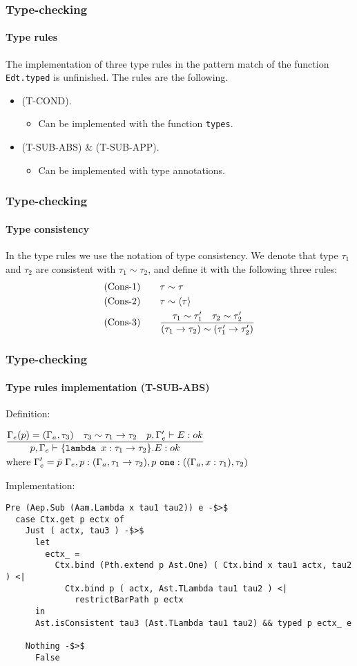 \begin{frame}
    \frametitle{Type-checking}
    \framesubtitle{Type rules}
    The implementation of three type rules in the pattern match of the
    function \texttt{Edt.typed} is unfinished. The rules are the
    following.
    \pause
    \begin{itemize}
      \item (T-COND).
        \begin{itemize}
          \item Can be implemented with the function \texttt{types}.
        \end{itemize}
        \pause
      \item (T-SUB-ABS) \& (T-SUB-APP).
        \begin{itemize}
          \item Can be implemented with type annotations.
        \end{itemize}
    \end{itemize}
\end{frame}

\begin{frame}
    \frametitle{Type-checking}
    \framesubtitle{Type consistency}
    In the type rules we use the notation of type consistency. We denote
    that type $\tau_1$ and $\tau_2$ are consistent with $\tau_1 \sim
    \tau_2$, and define it with the following three rules:
    \begin{align*}
      &\text{(Cons-1)}\qquad\tau\sim\tau\\
      &\text{(Cons-2)}\qquad\tau\sim\langle \tau \rangle\\
      &\text{(Cons-3)}\qquad\frac{\tau_1\sim\tau_1'\quad\tau_2\sim\tau_2'}{(\tau_1\to\tau_2)\sim(\tau_1'\to\tau_2')} 
    \end{align*}
\end{frame}

\begin{frame}[fragile]
    \frametitle{Type-checking}
    \framesubtitle{Type rules implementation (T-SUB-ABS)}
    Definition:
    \begin{center}\scriptsize{$\begin{aligned} & \frac{\Gamma_{e}(p)=(\Gamma_{a},\tau_3)\quad\tau_3\sim\tau_1\to\tau_2\quad p,\Gamma_{e}'\vdash E : ok} {p,\Gamma_{e}\vdash\{\texttt{lambda }x : \tau_1\to\tau_2\}.E : ok}\\ & \text{where }\Gamma_{e}'=\bar{p}~\Gamma_{e},p : (\Gamma_{a},\tau_1\to\tau_2),p~\texttt{one} : ((\Gamma_{a},x : \tau_1),\tau_2) \end{aligned}$}\end{center}
    \pause
    Implementation:
    \begin{lstlisting}[basicstyle=\tiny]
Pre (Aep.Sub (Aam.Lambda x tau1 tau2)) e -$>$
  case Ctx.get p ectx of
    Just ( actx, tau3 ) -$>$
      let
        ectx_ =
          Ctx.bind (Pth.extend p Ast.One) ( Ctx.bind x tau1 actx, tau2 ) <|
            Ctx.bind p ( actx, Ast.TLambda tau1 tau2 ) <|
              restrictBarPath p ectx
      in
      Ast.isConsistent tau3 (Ast.TLambda tau1 tau2) && typed p ectx_ e

    Nothing -$>$
      False
    \end{lstlisting}
\end{frame}

